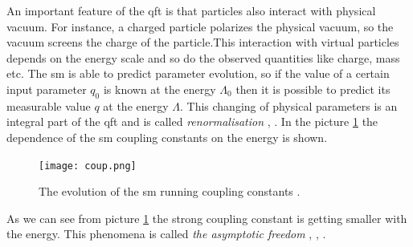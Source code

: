 An important feature of the \gls{qft} is that particles also interact with physical vacuum. For instance, a charged particle polarizes the physical vacuum, so the vacuum screens the charge of the particle\cite{Schwinger_polariz}.This interaction with virtual particles depends on the energy scale and so do the observed quantities like charge, mass etc. The \gls{sm} is able to predict parameter evolution, so if the value of a certain input parameter $q_0$ is known at the energy $\Lambda_0$ then it is possible to predict its measurable value $q$ at the energy $\Lambda$. This changing of physical parameters is an integral part of the \gls{qft} and is called \textit{renormalisation} \cite{bogol}, \cite{Glashow:1959wxa}. In the picture \ref{fig::running} the dependence of the \gls{sm} coupling constants on the energy is shown. \\

	 \begin{figure}[htpb]
	\texttt{[image: coup.png]}
	\caption{The evolution of the \gls{sm} running coupling constants \cite{coupl_wiki}. }
	\label{fig::running}
	\end{figure}
As we can see from picture \ref{fig::running} the strong coupling constant is getting smaller with the energy. This phenomena is called \textit{the asymptotic freedom} \cite{Gross}, \cite{Politzer}, \cite{Vanyashin}.




